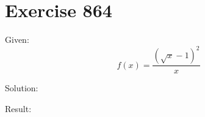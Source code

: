 \documentclass[a4paper, 10pt]{scrartcl}
\begin{document}
\section{Exercise 864}

Given:
\[
f(x) = \frac{(\sqrt{x} - 1)^{2}}{x}
\]

Solution:

Result:
\end{document}
